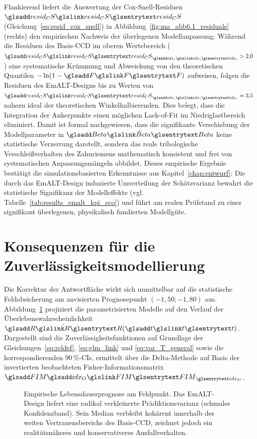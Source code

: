 Flankierend liefert die Auswertung der Cox-Snell-Residuen $\sym{resid_CS}$ (Gleichung~\eqref{eq:resid_cox_snell}) in Abbildung~\ref{fig:ma_abb6.1_residuals} (rechts) den empirischen Nachweis der überlegenen Modellanpassung:
Während die Residuen des Basis-\ac{CCD} im oberen Wertebereich (${\sym{resid_CS}}_{\sym{idx_i}} > 2{,}0$) eine systematische Krümmung und Abweichung von den theoretischen Quantilen $-\ln(1-\sym{F})$ aufweisen, folgen die Residuen des \ac{EmALT}-Designs bis zu Werten von ${\sym{resid_CS}}_{\sym{idx_i}} \approx 3{,}5$ nahezu ideal der theoretischen Winkelhalbierenden.
Dies belegt, dass die Integration der Ankerpunkte einen möglichen Lack-of-Fit im Niedriglastbereich eliminiert.
Damit ist formal nachgewiesen, dass die signifikante Verschiebung der Modellparameter in $\hat{\sym{Beta}}$ keine statistische Verzerrung darstellt, sondern das reale tribologische Verschleißverhalten des Zahnriemens mathematisch konsistent und frei von systematischen Anpassungsmängeln abbildet.
Dieses empirische Ergebnis bestätigt die simulationsbasierten Erkenntnisse aus Kapitel~\ref{chap:entwurf}: Die durch das \ac{EmALT}-Design induzierte Umverteilung der Schätzvarianz bewahrt die statistische Signifikanz der Modelleffekte (vgl. Tabelle~\ref{tab:results_emalt_kpi_eco}) und führt am realen Prüfstand zu einer signifikant überlegenen, physikalisch fundierten Modellgüte.

\section{Konsequenzen für die Zuverlässigkeitsmodellierung} \label{sec:case_falsifikation}

Die Korrektur der Antwortfläche wirkt sich unmittelbar auf die statistische Feldabsicherung am anvisierten Prognosepunkt $(-1{,}50 ; -1{,}80)$ aus.
Abbildung~\ref{fig:ma_abb6.1_reliability_ci} projiziert die parametrisierten Modelle auf den Verlauf der Überlebenswahrscheinlichkeit $\hat{\sym{R}}(\sym{t})$.
Dargestellt sind die Zuverlässigkeitsfunktionen auf Grundlage der Gleichungen~\eqref{eq:reldef}, \eqref{eq:glm_link} und \eqref{eq:var_T_general} sowie die korrespondierenden $90\,\%$-\acp{CI}, ermittelt über die Delta-Methode auf Basis der invertierten beobachteten Fisher-Informationsmatrix $\symsub{FIM}{idx_O}$.

\begin{figure}[htbp]
    \centering
    \setlength{}
    \setlength\figureheight{6.5cm}
    
    \caption{Empirische Lebensdauerprognose am Feldpunkt. Das \ac{EmALT}-Design liefert eine radikal verkleinerte Prädiktionsvarianz (schmales Konfidenzband). Sein Median verbleibt kohärent innerhalb des weiten Vertrauensbereichs des Basis-\ac{CCD}, zeichnet jedoch ein realitätsnäheres und konservativeres Ausfallverhalten.}
    \label{fig:ma_abb6.1_reliability_ci}
\end{figure}

